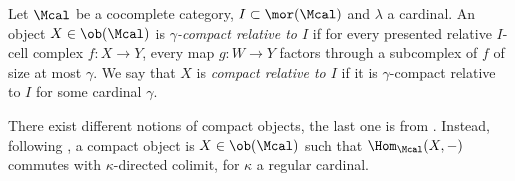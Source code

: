         \begin{defn}
            \label{defn:hirschorn_compact}
            Let $\Mcal$ be a cocomplete category, $I \subset \mor(\Mcal)$ and $\lambda$ a cardinal. An object $X \in \ob(\Mcal)$ is \emph{$\gamma$-compact relative to $I$} if for every presented relative $I$-cell complex $f\colon  X \to Y$, every map $g\colon W \to Y$ factors through a subcomplex of $f$ of size at most $\gamma$.
            We say that $X$ is \emph{compact relative to $I$} if it is $\gamma$-compact relative to $I$ for some cardinal $\gamma$.
        \end{defn}
        \begin{remark}
            \label{remark:hovey_compact}
            There exist different notions of compact objects, the last one is from \cite{Hirs:loc}. Instead, following \cite{Hov:model}, a compact object is $X \in \ob(\Mcal)$ such that $\Hom_{\Mcal}(X, -)$ commutes with $\kappa$-directed colimit, for $\kappa$ a regular cardinal.
        \end{remark}
        
